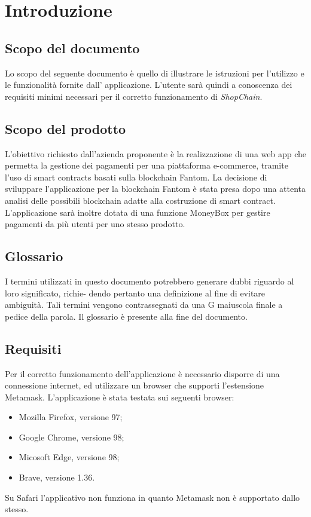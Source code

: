 \section{Introduzione}\label{section:introduzione}

\subsection{Scopo del documento}
Lo scopo del seguente documento è quello di illustrare le istruzioni per l'utilizzo e le funzionalità fornite dall' applicazione.
L'utente sarà quindi a conoscenza dei requisiti minimi necessari per il corretto funzionamento di \textit{ShopChain}.

\subsection{Scopo del prodotto}
L'obiettivo richiesto dall'azienda proponente è la realizzazione di una web app\glo{} che permetta la gestione dei pagamenti per una piattaforma e-commerce\glo{}, tramite l'uso di smart contracts\glo{} basati sulla blockchain\glo{} Fantom\glo{}.
La decisione di sviluppare l'applicazione per la blockchain\glo{} Fantom\glo{} è stata presa dopo una attenta analisi delle possibili blockchain\glo{} adatte alla costruzione di smart contract\glo{}.
L'applicazione sarà inoltre dotata di una funzione MoneyBox\glo{} per gestire pagamenti da più utenti per uno stesso prodotto.

\subsection{Glossario}
I termini utilizzati in questo documento potrebbero generare dubbi riguardo al loro significato, richie-
dendo pertanto una definizione al fine di evitare ambiguità. Tali termini vengono contrassegnati da
una G maiuscola finale a pedice della parola. Il glossario è presente alla fine del documento.

\subsection{Requisiti}
Per il corretto funzionamento dell'applicazione è necessario disporre di una connessione internet, ed utilizzare un browser che supporti l'estensione Metamask\glo{}.
L'applicazione è stata testata sui seguenti browser:
\begin{itemize}
    \item Mozilla Firefox, versione 97;
    \item Google Chrome, versione 98;
    \item Micosoft Edge, versione 98;
    \item Brave, versione 1.36.
\end{itemize}
Su Safari l'applicativo non funziona in quanto Metamask non è supportato dallo stesso.
